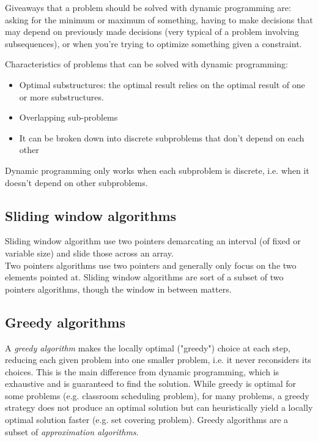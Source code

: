 \documentclass[8pt, table, xcdraw]{article}%
\begin{document}
Giveaways that a problem should be solved with dynamic programming are: asking for the minimum or maximum of something, having to make decisions that may depend on previously made decisions (very typical of a problem involving subsequences), or when you’re trying to optimize something given a constraint.

Characteristics of problems that can be solved with dynamic programming:

\begin{itemize}
    \item Optimal substructures: the optimal result relies on the optimal result of one or more substructures.
    \item Overlapping sub-problems
    \item It can be broken down into discrete subproblems that don’t depend on each other
\end{itemize}

Dynamic programming only works when each subproblem is discrete, i.e. when it doesn’t depend on other subproblems.

\subsection{Sliding window algorithms}

Sliding window algorithm use two pointers demarcating an interval (of fixed or variable size) and slide those across an array.\\
Two pointers algorithms use two pointers and generally only focus on the two elements pointed at. Sliding window algorithms are sort of a subset of two pointers algorithms, though the window in between matters.

\subsection{Greedy algorithms}

A \emph{greedy algorithm} makes the locally optimal ("greedy") choice at each step, reducing each given problem into one smaller problem, i.e. it never reconsiders its choices. This is the main difference from dynamic programming, which is exhaustive and is guaranteed to find the solution. While greedy is optimal for some problems (e.g. classroom scheduling problem), for many problems, a greedy strategy does not produce an optimal solution but can heuristically yield a locally optimal solution faster (e.g. set covering problem). Greedy algorithms are a subset of \emph{approximation algorithms}.
\end{document}

